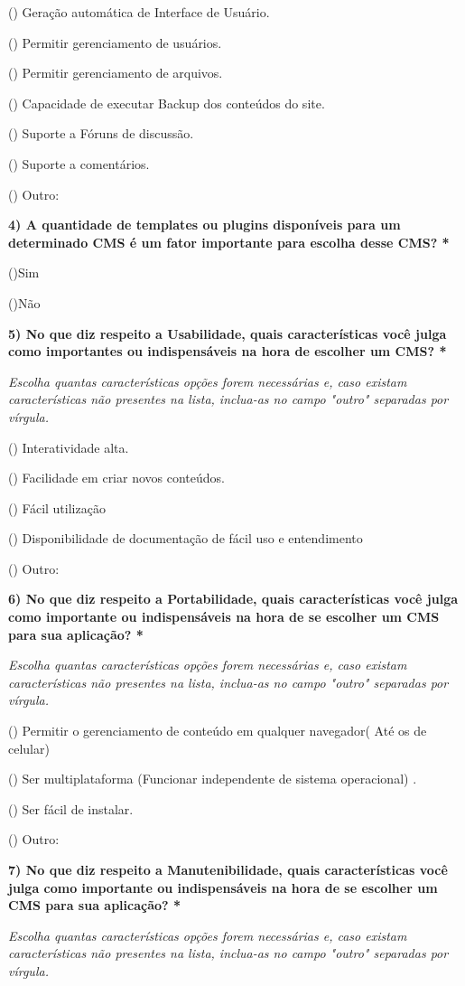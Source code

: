 \begin{apendicesenv}
() Geração automática de Interface de Usuário.
 
() Permitir gerenciamento de usuários.
 
() Permitir gerenciamento de arquivos.
 
() Capacidade de executar Backup dos conteúdos do site.
 
() Suporte a Fóruns de discussão.
 
() Suporte a comentários.
 
() Outro: 
 
\textbf{4) A quantidade de templates ou plugins disponíveis para um determinado CMS é um fator importante para escolha desse CMS? *}

()Sim

()Não


\textbf{5) No que diz respeito a Usabilidade, quais características você julga como importantes ou indispensáveis na hora de escolher um CMS? *}

\textit{Escolha quantas características opções forem necessárias e, caso existam características não presentes na lista, inclua-as no campo "outro" separadas por vírgula.}

()  Interatividade alta.

() Facilidade em criar novos conteúdos.

() Fácil utilização

() Disponibilidade de documentação de fácil uso e entendimento

() Outro: 


\textbf{6) No que diz respeito a Portabilidade, quais características você julga como importante ou indispensáveis na hora de se escolher um CMS para sua aplicação? *}

\textit{Escolha quantas características opções forem necessárias e, caso existam características não presentes na lista, inclua-as no campo "outro" separadas por vírgula.}

()  Permitir o gerenciamento de conteúdo em qualquer navegador( Até os de celular)

() Ser multiplataforma (Funcionar independente de sistema operacional) .

() Ser fácil de instalar.

() Outro: 


\textbf{7) No que diz respeito a Manutenibilidade, quais características você julga como importante ou indispensáveis na hora de se escolher um CMS para sua aplicação? *}

\textit{Escolha quantas características opções forem necessárias e, caso existam características não presentes na lista, inclua-as no campo "outro" separadas por vírgula.}


\end{apendicesenv}
